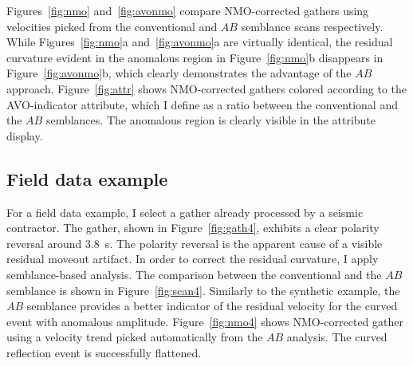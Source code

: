  

Figures~\ref{fig:nmo} and~\ref{fig:avonmo} compare NMO-corrected
gathers using velocities picked from the conventional and $AB$
semblance scans respectively. While Figures~\ref{fig:nmo}a
and~\ref{fig:avonmo}a are virtually identical, the residual curvature
evident in the anomalous region in Figure~\ref{fig:nmo}b disappears in
Figure~\ref{fig:avonmo}b, which clearly demonstrates the advantage of
the $AB$ approach. Figure~\ref{fig:attr} shows NMO-corrected
gathers colored according to the AVO-indicator attribute, which I
define as a ratio between the conventional and the $AB$
semblances.  The anomalous region is clearly visible in the attribute
display.


\subsection{Field data example}

For a field data example, I select a gather already processed by a
seismic contractor. The gather, shown in Figure~\ref{fig:gath4},
exhibits a clear polarity reversal around 3.8~s. The polarity
reversal is the apparent cause of a visible residual moveout
artifact. In order to correct the residual curvature, I apply
semblance-based analysis. The comparison between the conventional and
the $AB$ semblance is shown in
Figure~\ref{fig:scan4}. Similarly to the synthetic example, the
$AB$ semblance provides a better indicator of the residual
velocity for the curved event with anomalous
amplitude. Figure~\ref{fig:nmo4} shows NMO-corrected gather using a
velocity trend picked automatically from the $AB$
analysis. The curved reflection event is successfully flattened.

